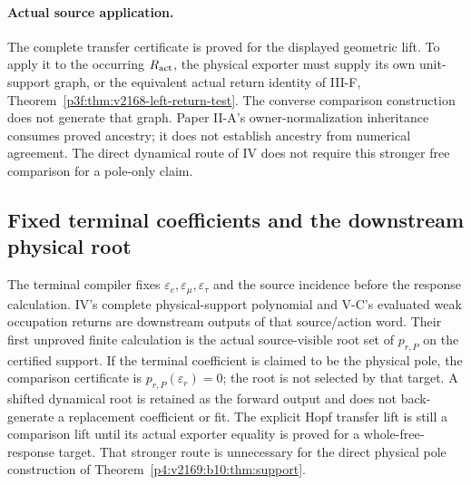 \documentclass[12pt,a4paper]{article}
\begin{document}
\paragraph{Actual source application.}
The complete transfer certificate is proved for the displayed geometric
lift. To apply it to the occurring $R_{\rm act}$, the physical exporter must
supply its own unit-support graph, or the equivalent actual return identity
of III-F, Theorem~\ref{p3f:thm:v2168-left-return-test}. The converse
comparison construction does not generate that graph. Paper II-A's
owner-normalization inheritance consumes proved ancestry; it does not
establish ancestry from numerical agreement. The direct dynamical route
of IV does not require this stronger free comparison for a pole-only claim.





\subsection{Fixed terminal coefficients and the downstream physical root}
\label{p6:sec:v2169-terminal-root-comparison}

The terminal compiler fixes $\varepsilon_e,\varepsilon_\mu,\varepsilon_\tau$
and the source incidence before the response calculation. IV's complete
physical-support polynomial and V-C's evaluated weak occupation returns
are downstream outputs of that source/action word. Their first unproved
finite calculation is the actual source-visible root set of $p_{r,P}$ on the
certified support.  If the terminal coefficient is claimed to be the physical
pole, the comparison certificate is $p_{r,P}(\varepsilon_r)=0$; the root is
not selected by that target.  A shifted dynamical root is retained as the
forward output and does not back-generate a replacement coefficient or fit.
The explicit Hopf transfer lift is still a comparison lift until its actual
exporter equality is proved for a whole-free-response target. That stronger
route is unnecessary for the direct physical pole construction of
Theorem~\ref{p4:v2169:b10:thm:support}.

\end{document}
